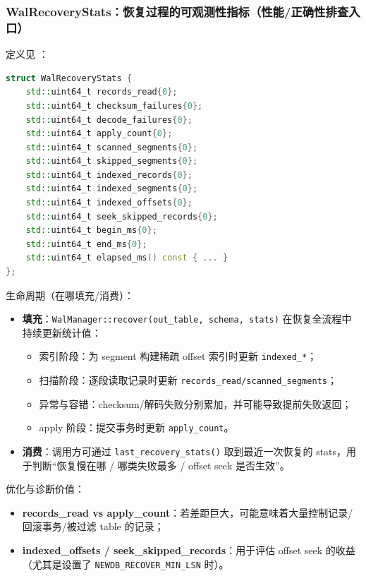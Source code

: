 \subsubsection{WalRecoveryStats：恢复过程的可观测性指标（性能/正确性排查入口）}

定义见 ：

\begin{lstlisting}[language=C++,caption={WalRecoveryStats（字段节选）}]
struct WalRecoveryStats {
    std::uint64_t records_read{0};
    std::uint64_t checksum_failures{0};
    std::uint64_t decode_failures{0};
    std::uint64_t apply_count{0};
    std::uint64_t scanned_segments{0};
    std::uint64_t skipped_segments{0};
    std::uint64_t indexed_records{0};
    std::uint64_t indexed_segments{0};
    std::uint64_t indexed_offsets{0};
    std::uint64_t seek_skipped_records{0};
    std::uint64_t begin_ms{0};
    std::uint64_t end_ms{0};
    std::uint64_t elapsed_ms() const { ... }
};
\end{lstlisting}

生命周期（在哪填充/消费）：

\begin{itemize}
  \item \textbf{填充}：\texttt{WalManager::recover(out\_table, schema, stats)} 在恢复全流程中持续更新统计值：
    \begin{itemize}
      \item 索引阶段：为 segment 构建稀疏 offset 索引时更新 \texttt{indexed\_*}；
      \item 扫描阶段：逐段读取记录时更新 \texttt{records\_read/scanned\_segments}；
      \item 异常与容错：checksum/解码失败分别累加，并可能导致提前失败返回；
      \item apply 阶段：提交事务时更新 \texttt{apply\_count}。
    \end{itemize}
  \item \textbf{消费}：调用方可通过 \texttt{last\_recovery\_stats()} 取到最近一次恢复的 stats，用于判断“恢复慢在哪 / 哪类失败最多 / offset seek 是否生效”。
\end{itemize}

优化与诊断价值：

\begin{itemize}
  \item \textbf{records\_read vs apply\_count}：若差距巨大，可能意味着大量控制记录/回滚事务/被过滤 table 的记录；
  \item \textbf{indexed\_offsets / seek\_skipped\_records}：用于评估 offset seek 的收益（尤其是设置了 \texttt{NEWDB\_RECOVER\_MIN\_LSN} 时）。
\end{itemize}

